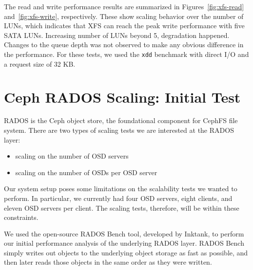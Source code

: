 \documentclass{article}
\begin{document}



The read and write performance results are summarized in
Figures~\ref{fig:xfs-read} and~\ref{fig:xfs-write}, respectively. These show
scaling behavior over the number of LUNs, which indicates that XFS can reach
the peak write performance with five SATA LUNs. Increasing number of LUNs
beyond 5, degradation happened. 
Changes to the queue depth was not observed to make any obvious difference in
the performance. For these tests, we used the \verb!xdd! benchmark with direct
I/O and a request size of 32 KB.


\section{Ceph RADOS Scaling: Initial Test}

RADOS is the Ceph object store, the foundational component for CephFS file
system. There are two types of scaling tests we are interested at the RADOS
layer:

\begin{itemize}
  \item scaling on the number of OSD servers
  \item scaling on the number of OSDs per OSD server
\end{itemize}

Our system setup poses some limitations on the scalability tests we wanted to
perform. In particular, we currently had four OSD servers, eight clients, and
eleven OSD servers per client. The scaling tests, therefore, will be within
these constraints.

We used the open-source RADOS Bench tool, developed by Inktank, to perform our
initial performance analysis of the underlying RADOS layer.  RADOS Bench simply
writes out objects to the underlying object storage as fast as possible, and
then later reads those objects in the same order as they were written.
\end{document}
